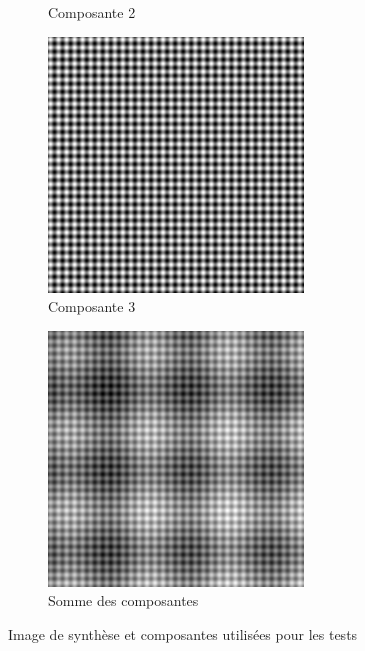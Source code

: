 \begin{figure}
\begin{subfigure}{.30\textwidth}
  \caption{Composante 2}
\end{subfigure}
\begin{subfigure}{.30\textwidth}
  \centering
  \includegraphics[width=.9\linewidth]{img/s_2}
  \caption{Composante 3}
\end{subfigure}
\begin{subfigure}{.30\textwidth}
  \centering
  \includegraphics[width=.9\linewidth]{img/s_c}
  \caption{Somme des composantes}
\end{subfigure}
\caption{Image de synthèse et composantes utilisées pour les tests}
\label{fig:s_1_4}
\end{figure}


